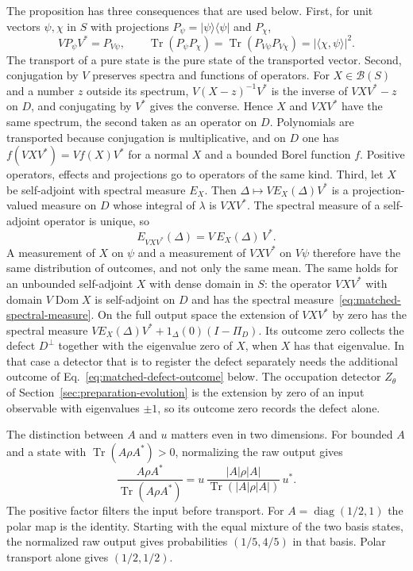 \documentclass[11pt]{article}
\theoremstyle{definition}
\DeclareMathOperator{\Tr}{Tr}
\newcommand{\ket}[1]{\lvert #1\rangle}
\newcommand{\bra}[1]{\langle #1\rvert}
\begin{document}
The proposition has three consequences that are used below. First, for unit vectors $\psi,\chi$ in $S$ with projections $P_\psi=\ket{\psi}\!\bra{\psi}$ and $P_\chi$,
\begin{equation}
 VP_\psi V^*=P_{V\psi},\qquad
 \Tr(P_\psi P_\chi)=\Tr(P_{V\psi}P_{V\chi})=|\langle\chi,\psi\rangle|^2 .
 \label{eq:matched-pure-projections}
\end{equation}
The transport of a pure state is the pure state of the transported vector. Second, conjugation by $V$ preserves spectra and functions of operators. For $X\in\mathcal B(S)$ and a number $z$ outside its spectrum, $V(X-z)^{-1}V^*$ is the inverse of $VXV^*-z$ on $D$, and conjugating by $V^*$ gives the converse. Hence $X$ and $VXV^*$ have the same spectrum, the second taken as an operator on $D$. Polynomials are transported because conjugation is multiplicative, and on $D$ one has $f(VXV^*)=Vf(X)V^*$ for a normal $X$ and a bounded Borel function $f$. Positive operators, effects and projections go to operators of the same kind. Third, let $X$ be self-adjoint with spectral measure $E_X$. Then $\Delta\mapsto VE_X(\Delta)V^*$ is a projection-valued measure on $D$ whose integral of $\lambda$ is $VXV^*$. The spectral measure of a self-adjoint operator is unique, so
\begin{equation}
 E_{VXV^*}(\Delta)=V\,E_X(\Delta)\,V^* .
 \label{eq:matched-spectral-measure}
\end{equation}
A measurement of $X$ on $\psi$ and a measurement of $VXV^*$ on $V\psi$ therefore have the same distribution of outcomes, and not only the same mean. The same holds for an unbounded self-adjoint $X$ with dense domain in $S$: the operator $VXV^*$ with domain $V\operatorname{Dom}X$ is self-adjoint on $D$ and has the spectral measure~\eqref{eq:matched-spectral-measure}. On the full output space the extension of $VXV^*$ by zero has the spectral measure $VE_X(\Delta)V^*+1_\Delta(0)(I-\Pi_D)$. Its outcome zero collects the defect $D^\perp$ together with the eigenvalue zero of $X$, when $X$ has that eigenvalue. In that case a detector that is to register the defect separately needs the additional outcome of Eq.~\eqref{eq:matched-defect-outcome} below. The occupation detector $Z_\theta$ of Section~\ref{sec:preparation-evolution} is the extension by zero of an input observable with eigenvalues $\pm1$, so its outcome zero records the defect alone.

The distinction between $A$ and $u$ matters even in two dimensions. For bounded $A$ and a state with $\Tr(A\rho A^*)>0$, normalizing the raw output gives
\[
 \frac{A\rho A^*}{\Tr(A\rho A^*)}
 =u\,\frac{|A|\rho|A|}{\Tr(|A|\rho|A|)}\,u^* .
\]
The positive factor filters the input before transport. For $A=\operatorname{diag}(1/2,1)$ the polar map is the identity. Starting with the equal mixture of the two basis states, the normalized raw output gives probabilities $(1/5,4/5)$ in that basis. Polar transport alone gives $(1/2,1/2)$.
\end{document}
